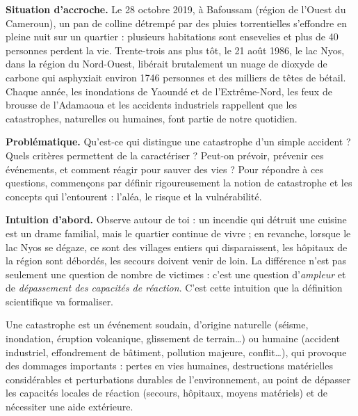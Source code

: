 \documentclass[11pt]{article}
\newcommand{\cle}[1]{{\popxbold\color{popdark}#1}}
\newcounter{popsec}
\newcounter{popsub}
\newcommand{\courssub}[1]{%
  \stepcounter{popsub}%
  \par\vspace{9pt}\noindent{\popxbold\fontsize{11.5}{13}\selectfont\color{popink}{\color{poporange}\thepopsec.\thepopsub}\hspace{6pt}#1}\par\nopagebreak\vspace{4pt}
}
\begin{document}
\textbf{Situation d'accroche.} Le 28 octobre 2019, à Bafoussam (région de l'Ouest du Cameroun), un pan de colline détrempé par des pluies torrentielles s'effondre en pleine nuit sur un quartier : plusieurs habitations sont ensevelies et plus de 40 personnes perdent la vie. Trente-trois ans plus tôt, le 21 août 1986, le lac Nyos, dans la région du Nord-Ouest, libérait brutalement un nuage de dioxyde de carbone qui asphyxiait environ \num{1746} personnes et des milliers de têtes de bétail. Chaque année, les inondations de Yaoundé et de l'Extrême-Nord, les feux de brousse de l'Adamaoua et les accidents industriels rappellent que les catastrophes, naturelles ou humaines, font partie de notre quotidien.

\textbf{Problématique.} Qu'est-ce qui distingue une catastrophe d'un simple accident ? Quels critères permettent de la caractériser ? Peut-on prévoir, prévenir ces événements, et comment réagir pour sauver des vies ? Pour répondre à ces questions, commençons par définir rigoureusement la notion de catastrophe et les concepts qui l'entourent : l'aléa, le risque et la vulnérabilité.

\courssub{Qu'est-ce qu'une catastrophe ?}

\textbf{Intuition d'abord.} Observe autour de toi : un incendie qui détruit une cuisine est un drame familial, mais le quartier continue de vivre ; en revanche, lorsque le lac Nyos se dégaze, ce sont des villages entiers qui disparaissent, les hôpitaux de la région sont débordés, les secours doivent venir de loin. La différence n'est pas seulement une question de nombre de victimes : c'est une question d'\emph{ampleur} et de \emph{dépassement des capacités de réaction}. C'est cette intuition que la définition scientifique va formaliser.

\begin{definition}[Catastrophe]
Une \cle{catastrophe} est un événement \cle{soudain}, d'origine \cle{naturelle} (séisme, inondation, éruption volcanique, glissement de terrain\ldots) ou \cle{humaine} (accident industriel, effondrement de bâtiment, pollution majeure, conflit\ldots), qui provoque des \cle{dommages importants} : pertes en vies humaines, destructions matérielles considérables et perturbations durables de l'environnement, au point de \cle{dépasser les capacités locales de réaction} (secours, hôpitaux, moyens matériels) et de nécessiter une aide extérieure.
\end{definition}
\end{document}
